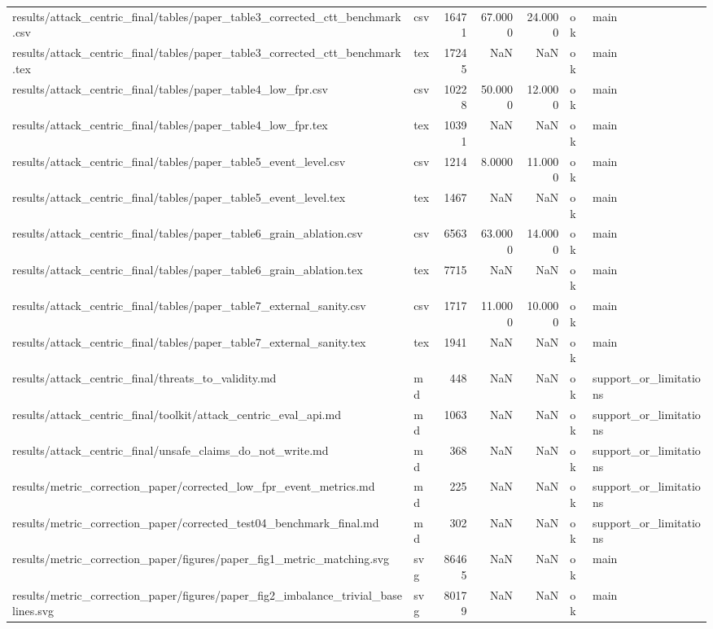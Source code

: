 \begin{tabular}{llrrrll}
results/attack_centric_final/tables/paper_table3_corrected_ctt_benchmark.csv & csv & 16471 & 67.0000 & 24.0000 & ok & main \\
results/attack_centric_final/tables/paper_table3_corrected_ctt_benchmark.tex & tex & 17245 & NaN & NaN & ok & main \\
results/attack_centric_final/tables/paper_table4_low_fpr.csv & csv & 10228 & 50.0000 & 12.0000 & ok & main \\
results/attack_centric_final/tables/paper_table4_low_fpr.tex & tex & 10391 & NaN & NaN & ok & main \\
results/attack_centric_final/tables/paper_table5_event_level.csv & csv & 1214 & 8.0000 & 11.0000 & ok & main \\
results/attack_centric_final/tables/paper_table5_event_level.tex & tex & 1467 & NaN & NaN & ok & main \\
results/attack_centric_final/tables/paper_table6_grain_ablation.csv & csv & 6563 & 63.0000 & 14.0000 & ok & main \\
results/attack_centric_final/tables/paper_table6_grain_ablation.tex & tex & 7715 & NaN & NaN & ok & main \\
results/attack_centric_final/tables/paper_table7_external_sanity.csv & csv & 1717 & 11.0000 & 10.0000 & ok & main \\
results/attack_centric_final/tables/paper_table7_external_sanity.tex & tex & 1941 & NaN & NaN & ok & main \\
results/attack_centric_final/threats_to_validity.md & md & 448 & NaN & NaN & ok & support_or_limitations \\
results/attack_centric_final/toolkit/attack_centric_eval_api.md & md & 1063 & NaN & NaN & ok & support_or_limitations \\
results/attack_centric_final/unsafe_claims_do_not_write.md & md & 368 & NaN & NaN & ok & support_or_limitations \\
results/metric_correction_paper/corrected_low_fpr_event_metrics.md & md & 225 & NaN & NaN & ok & support_or_limitations \\
results/metric_correction_paper/corrected_test04_benchmark_final.md & md & 302 & NaN & NaN & ok & support_or_limitations \\
results/metric_correction_paper/figures/paper_fig1_metric_matching.svg & svg & 86465 & NaN & NaN & ok & main \\
results/metric_correction_paper/figures/paper_fig2_imbalance_trivial_baselines.svg & svg & 80179 & NaN & NaN & ok & main \\

\end{tabular}

